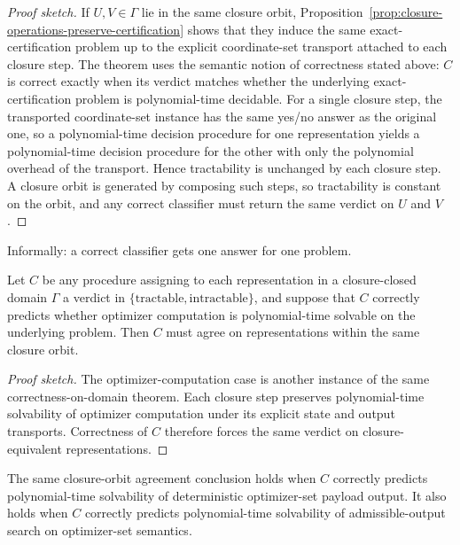 \begin{proof}[Proof sketch]
If $U,V \in \Gamma$ lie in the same closure orbit, Proposition~\ref{prop:closure-operations-preserve-certification} shows that they induce the same exact-certification problem up to the explicit coordinate-set transport attached to each closure step. The theorem uses the semantic notion of correctness stated above: $C$ is correct exactly when its verdict matches whether the underlying exact-certification problem is polynomial-time decidable. For a single closure step, the transported coordinate-set instance has the same yes/no answer as the original one, so a polynomial-time decision procedure for one representation yields a polynomial-time decision procedure for the other with only the polynomial overhead of the transport. Hence tractability is unchanged by each closure step. A closure orbit is generated by composing such steps, so tractability is constant on the orbit, and any correct classifier must return the same verdict on $U$ and $V$.
\end{proof}

\par\medskip
\noindent
Informally: a correct classifier gets one answer for one problem.
\par\medskip

\begin{theorem}\label{thm:optimizer-computation-classifier-forces-invariance}
Let $C$ be any procedure assigning to each representation in a closure-closed domain $\Gamma$ a verdict in $\{\mathrm{tractable},\mathrm{intractable}\}$, and suppose that $C$ correctly predicts whether optimizer computation is polynomial-time solvable on the underlying problem. Then $C$ must agree on representations within the same closure orbit.
\end{theorem}

\begin{proof}[Proof sketch]
The optimizer-computation case is another instance of the same correctness-on-domain theorem. Each closure step preserves polynomial-time solvability of optimizer computation under its explicit state and output transports. Correctness of $C$ therefore forces the same verdict on closure-equivalent representations.
\end{proof}

\begin{corollary}\label{cor:payload-search-compute-classifier-forces-invariance}
The same closure-orbit agreement conclusion holds when $C$ correctly predicts polynomial-time solvability of deterministic optimizer-set payload output. It also holds when $C$ correctly predicts polynomial-time solvability of admissible-output search on optimizer-set semantics.
\end{corollary}

